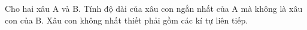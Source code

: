 Cho hai xâu A và B. Tính độ dài của xâu con ngắn nhất của A mà không là  xâu con của B. Xâu con không nhất thiết phải gồm các kí tự liên tiếp.